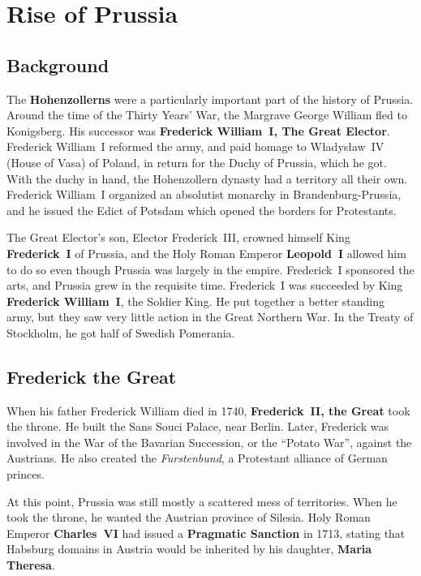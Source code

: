 \section{Rise of Prussia}

\subsection*{Background}

The \textbf{Hohenzollerns} were a particularly important part of the history of Prussia.
Around the time of the Thirty Years' War, the Margrave George William fled to Konigsberg.
His successor was \textbf{Frederick William~I, The Great Elector}.
Frederick William~I reformed the army, and paid homage to W\l{}adys\l{}aw~IV (House of Vasa) of Poland,
in return for the Duchy of Prussia, which he got.
With the duchy in hand, the Hohenzollern dynasty had a territory all their own.
Frederick William~I organized an absolutist monarchy in Brandenburg-Prussia,
and he issued the Edict of Potsdam which opened the borders for Protestants.

The Great Elector's son, Elector Frederick~III, crowned himself King \textbf{Frederick~I} of Prussia,
and the Holy Roman Emperor \textbf{Leopold~I} allowed him to do so even though Prussia was largely in the empire.
Frederick~I sponsored the arts, and Prussia grew in the requisite time.
Frederick~I was succeeded by King \textbf{Frederick William~I}, the Soldier King.
He put together a better standing army, but they saw very little action in the Great Northern War.
In the Treaty of Stockholm, he got half of Swedish Pomerania.

\subsection*{Frederick the Great}

When his father Frederick William died in 1740, \textbf{Frederick~II, the Great} took the throne.
He built the Sans Souci Palace, near Berlin.
Later, Frederick was involved in the War of the Bavarian Succession, or the ``Potato War'',
against the Austrians.
He also created the \textit{Furstenbund}, a Protestant alliance of German princes.

At this point, Prussia was still mostly a scattered mess of territories.
When he took the throne, he wanted the Austrian province of Silesia.
Holy Roman Emperor \textbf{Charles~VI} had issued a \textbf{Pragmatic Sanction} in 1713,
stating that Habsburg domains in Austria would be inherited by his daughter, \textbf{Maria Theresa}.

